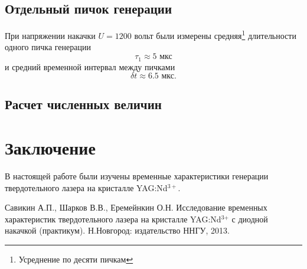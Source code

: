 \documentclass[a4paper,14pt]{extarticle}
\begin{document}
\subsection{Отдельный пичок генерации}

При напряжении накачки $U=1200$ вольт были измерены средняя\footnote{Усреднение по десяти пичкам} длительности одного пичка генерации
\begin{equation}
  \tau_1 \approx 5\text{ мкс}
\end{equation}
и средний временной интервал между пичками
\begin{equation}
  \delta t \approx 6.5\text{ мкс}.
\end{equation}
\subsection{Расчет численных величин}


\section*{Заключение}
В настоящей работе были изучены временные характеристики генерации твердотельного лазера на кристалле YAG:Nd$^{3+}$. 

\begin{thebibliography}{}

   Савикин А.П., Шарков В.В., Еремейнкин О.Н. Исследование временных характеристик твердотельного лазера на кристалле  YAG:Nd${}^{{3\texttt{+}}}$ с диодной накачкой (практикум). Н.Новгород: издательство ННГУ, 2013.

\end{thebibliography}
\end{document}
